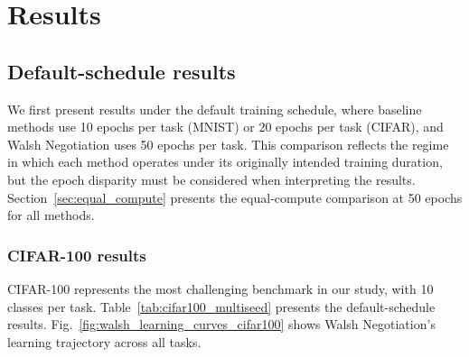 \documentclass[preprint,review,12pt]{elsarticle}
\begin{document}
\section{Results}

\subsection{Default-schedule results}
\label{sec:default_results}

We first present results under the default training schedule, where baseline methods use 10 epochs per task (MNIST) or 20 epochs per task (CIFAR), and Walsh Negotiation uses 50 epochs per task. This comparison reflects the regime in which each method operates under its originally intended training duration, but the epoch disparity must be considered when interpreting the results. Section~\ref{sec:equal_compute} presents the equal-compute comparison at 50 epochs for all methods.

\subsubsection{CIFAR-100 results}

CIFAR-100 represents the most challenging benchmark in our study, with 10 classes per task. Table~\ref{tab:cifar100_multiseed} presents the default-schedule results. Fig.~\ref{fig:walsh_learning_curves_cifar100} shows Walsh Negotiation's learning trajectory across all tasks.
\end{document}
